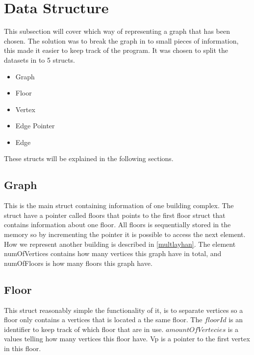 \begin{minipage}{\linewidth}
\section{Data Structure}
\label{sub:data_structure}

This subsection will cover which way of representing a graph that has been chosen. The solution was to break the graph in to small pieces of information, this made it easier to keep track of the program. It was chosen to split the datasets in to 5 structs.


\begin{itemize} [noitemsep]
	\item Graph
	\item Floor
	\item Vertex
	\item Edge Pointer
	\item Edge
\end{itemize}


These structs will be explained in the following sections.
\end{minipage} 

\begin{minipage}{\linewidth}
\subsection{Graph} 
This is the main struct containing information of one building complex.
The struct have a pointer called floors that points to the first floor struct that contains information about one floor. All floors is sequentially stored in the memory so by incrementing the pointer it is possible to access the next element. How we represent another building is described in \cref{multlayhan}. The element numOfVertices contains how many vertices this graph have in total, and numOfFloors is how many floors this graph have.


 \label{Graph_struct}
\end{minipage}

\begin{minipage}{\linewidth}
\subsection{Floor} \label{subsub:floor}
This struct reasonably simple the functionality of it, is to separate vertices so a floor only contains a vertices that is located a the same floor. The $floorId$ is an identifier to keep track of which floor that are in use.
$amountOfVertecies$ is a values telling how many vertices this floor have. Vp is a pointer to the first vertex in this floor.

 \label{Floor_struct}
\end{minipage}

